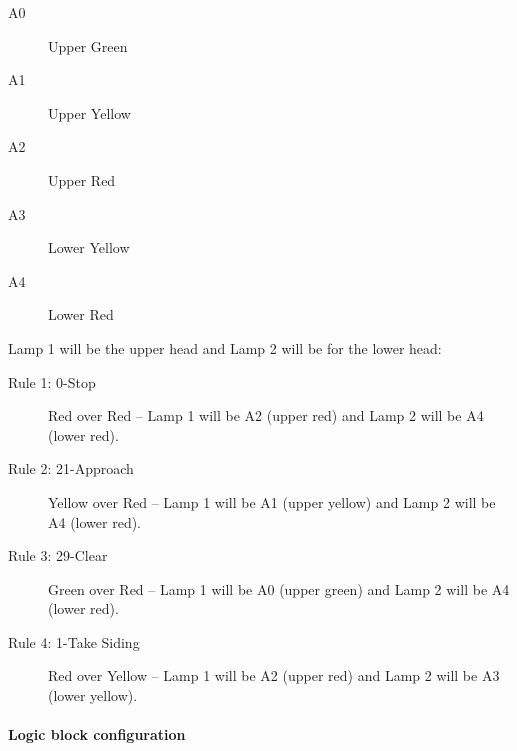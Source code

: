 \begin{description}
\item[A0] Upper Green
\item[A1] Upper Yellow
\item[A2] Upper Red
\item[A3] Lower Yellow
\item[A4] Lower Red
\end{description}
Lamp 1 will be the upper head and Lamp 2 will be for the lower head:
\begin{description}
\item[Rule 1: 0-Stop] Red over Red -- Lamp 1 will be A2 (upper red) and Lamp 2 
will be A4 (lower red).
\item[Rule 2: 21-Approach] Yellow over Red -- Lamp 1 will be A1 (upper yellow) 
and Lamp 2 will be A4 (lower red).
\item[Rule 3: 29-Clear] Green over Red -- Lamp 1 will be A0 (upper green) and 
Lamp 2 will be A4 (lower red).
\item[Rule 4: 1-Take Siding] Red over Yellow -- Lamp 1 will be A2 (upper red) 
and Lamp 2 will be A3 (lower yellow).
\end{description}

\clearpage
\paragraph{Logic block configuration}

